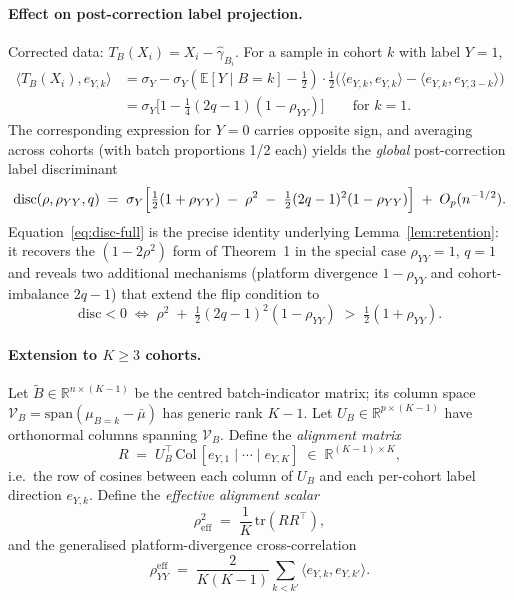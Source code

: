 \documentclass[11pt,a4paper]{article}
\newcommand{\R}{\mathbb{R}}
\newcommand{\E}{\mathbb{E}}
\begin{document}
\paragraph{Effect on post-correction label projection.}
Corrected data: $T_B(X_i)=X_i-\hat\gamma_{B_i}$. For a sample in
cohort $k$ with label $Y=1$,
\begin{align*}
  \langle T_B(X_i), e_{Y,k}\rangle
  &= \sigma_Y
    - \sigma_Y(\E[Y\mid B=k]-\tfrac12)\cdot\tfrac12
    \bigl(\langle e_{Y,k}, e_{Y,k}\rangle - \langle e_{Y,k},e_{Y,3-k}\rangle\bigr) \\
  &= \sigma_Y \bigl[1 - \tfrac14(2q-1)(1-\rho_{YY})\bigr]
      \qquad\text{for }k=1.
\end{align*}
The corresponding expression for $Y=0$ carries opposite sign, and
averaging across cohorts (with batch proportions 1/2 each) yields
the \emph{global} post-correction label discriminant
\begin{equation}
  \mathrm{disc}(\rho, \rho_{YY}, q)
  \;=\; \sigma_Y\Bigl[
     \tfrac12(1+\rho_{YY})
     \;-\; \rho^{2}
     \;-\; \tfrac12(2q-1)^{2}(1-\rho_{YY})
  \Bigr] \;+\; O_p(n^{-1/2}).
  \label{eq:disc-full}
\end{equation}
Equation~\eqref{eq:disc-full} is the precise identity underlying
Lemma~\ref{lem:retention}: it recovers the $(1-2\rho^2)$ form of
Theorem~1 in the special case $\rho_{YY}=1$, $q=1$ and reveals two
additional mechanisms (platform divergence $1-\rho_{YY}$ and
cohort-imbalance $2q-1$) that extend the flip condition to
\begin{equation}
  \mathrm{disc}<0
  \;\Leftrightarrow\;
  \rho^{2}
  \;+\;\tfrac12(2q-1)^{2}(1-\rho_{YY})
  \;>\;\tfrac12(1+\rho_{YY}).
  \label{eq:flip-extended}
\end{equation}
\paragraph{Extension to $K\ge 3$ cohorts.}
Let $\tilde B\in\R^{n\times(K-1)}$ be the centred batch-indicator
matrix; its column space
$\mathcal V_B=\mathrm{span}(\mu_{B=k}-\bar\mu)$ has generic rank
$K-1$. Let $U_B\in\R^{p\times(K-1)}$ have orthonormal columns
spanning $\mathcal V_B$. Define the \emph{alignment matrix}
\begin{equation}
  R \;=\; U_B^{\!\top}\,\mathrm{Col}\,[e_{Y,1}\;|\;\cdots\;|\;e_{Y,K}]
       \;\in\;\R^{(K-1)\times K},
  \label{eq:align-mat}
\end{equation}
i.e.\ the row of cosines between each column of $U_B$ and each
per-cohort label direction $e_{Y,k}$. Define the \emph{effective
alignment scalar}
\begin{equation}
  \rho^{2}_{\!\mathrm{eff}} \;=\; \frac{1}{K}\,\mathrm{tr}(R R^{\!\top}),
  \label{eq:rho-eff}
\end{equation}
and the generalised platform-divergence cross-correlation
\begin{equation}
  \rho_{YY}^{\!\mathrm{eff}} \;=\;
  \frac{2}{K(K-1)}\!\sum_{k<k'}\langle e_{Y,k}, e_{Y,k'}\rangle.
  \label{eq:rhoYY-eff}
\end{equation}
\end{document}
